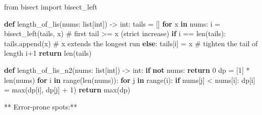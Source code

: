 \documentclass[11pt]{article}
\newenvironment{Shaded}{\begin{snugshade}}{\end{snugshade}}
\newcommand{\BuiltInTok}[1]{\textcolor[rgb]{0.50,0.55,0.55}{#1}}
\newcommand{\CommentTok}[1]{\textcolor[rgb]{0.48,0.49,0.49}{#1}}
\newcommand{\ControlFlowTok}[1]{\textcolor[rgb]{0.99,0.74,0.29}{\textbf{#1}}}
\newcommand{\DecValTok}[1]{\textcolor[rgb]{0.96,0.45,0.00}{#1}}
\newcommand{\ImportTok}[1]{\textcolor[rgb]{0.15,0.68,0.38}{#1}}
\newcommand{\KeywordTok}[1]{\textcolor[rgb]{0.81,0.81,0.76}{\textbf{#1}}}
\newcommand{\NormalTok}[1]{\textcolor[rgb]{0.81,0.81,0.76}{#1}}
\newcommand{\OperatorTok}[1]{\textcolor[rgb]{0.81,0.81,0.76}{#1}}
\begin{document}
\begin{Shaded}
\begin{Highlighting}[]
\ImportTok{from}\NormalTok{ bisect }\ImportTok{import}\NormalTok{ bisect\_left}

\KeywordTok{def}\NormalTok{ length\_of\_lis(nums: }\BuiltInTok{list}\NormalTok{[}\BuiltInTok{int}\NormalTok{]) }\OperatorTok{{-}\textgreater{}} \BuiltInTok{int}\NormalTok{:}
\NormalTok{    tails }\OperatorTok{=}\NormalTok{ []}
    \ControlFlowTok{for}\NormalTok{ x }\KeywordTok{in}\NormalTok{ nums:}
\NormalTok{        i }\OperatorTok{=}\NormalTok{ bisect\_left(tails, x)      }\CommentTok{\# first tail \textgreater{}= x  (strict increase)}
        \ControlFlowTok{if}\NormalTok{ i }\OperatorTok{==} \BuiltInTok{len}\NormalTok{(tails):}
\NormalTok{            tails.append(x)            }\CommentTok{\# x extends the longest run}
        \ControlFlowTok{else}\NormalTok{:}
\NormalTok{            tails[i] }\OperatorTok{=}\NormalTok{ x               }\CommentTok{\# tighten the tail of length i+1}
    \ControlFlowTok{return} \BuiltInTok{len}\NormalTok{(tails)}

\KeywordTok{def}\NormalTok{ length\_of\_lis\_n2(nums: }\BuiltInTok{list}\NormalTok{[}\BuiltInTok{int}\NormalTok{]) }\OperatorTok{{-}\textgreater{}} \BuiltInTok{int}\NormalTok{:}
    \ControlFlowTok{if} \KeywordTok{not}\NormalTok{ nums:}
        \ControlFlowTok{return} \DecValTok{0}
\NormalTok{    dp }\OperatorTok{=}\NormalTok{ [}\DecValTok{1}\NormalTok{] }\OperatorTok{*} \BuiltInTok{len}\NormalTok{(nums)}
    \ControlFlowTok{for}\NormalTok{ i }\KeywordTok{in} \BuiltInTok{range}\NormalTok{(}\BuiltInTok{len}\NormalTok{(nums)):}
        \ControlFlowTok{for}\NormalTok{ j }\KeywordTok{in} \BuiltInTok{range}\NormalTok{(i):}
            \ControlFlowTok{if}\NormalTok{ nums[j] }\OperatorTok{\textless{}}\NormalTok{ nums[i]:}
\NormalTok{                dp[i] }\OperatorTok{=} \BuiltInTok{max}\NormalTok{(dp[i], dp[j] }\OperatorTok{+} \DecValTok{1}\NormalTok{)}
    \ControlFlowTok{return} \BuiltInTok{max}\NormalTok{(dp)}
\end{Highlighting}
\end{Shaded}

** Error-prone spots:**
\end{document}
